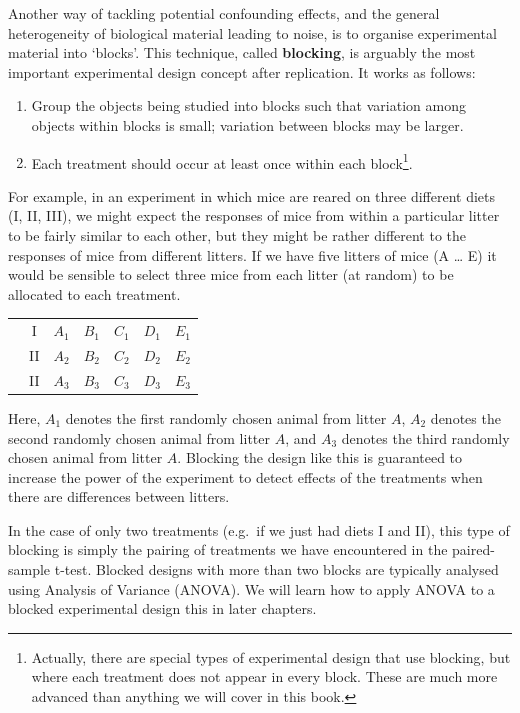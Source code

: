 \documentclass[
]{book}
\begin{document}
Another way of tackling potential confounding effects, and the general heterogeneity of biological material leading to noise, is to organise experimental material into `blocks'. This technique, called \textbf{blocking}, is arguably the most important experimental design concept after replication. It works as follows:

\begin{enumerate}
\def\labelenumi{\arabic{enumi}.}
\item
  Group the objects being studied into blocks such that variation among objects within blocks is small; variation between blocks may be larger.
\item
  Each treatment should occur at least once within each block\footnote{Actually, there are special types of experimental design that use blocking, but where each treatment does not appear in every block. These are much more advanced than anything we will cover in this book.}.
\end{enumerate}

For example, in an experiment in which mice are reared on three different diets (I, II, III), we might expect the responses of mice from within a particular litter to be fairly similar to each other, but they might be rather different to the responses of mice from different litters. If we have five litters of mice (A \ldots{} E) it would be sensible to select three mice from each litter (at random) to be allocated to each treatment.

\begin{longtable}[]{@{}lcccccc@{}}
\toprule
& & & & & & \\
\midrule
\endhead
& I & \(A_{1}\) & \(B_{1}\) & \(C_{1}\) & \(D_{1}\) & \(E_{1}\) \\
& II & \(A_{2}\) & \(B_{2}\) & \(C_{2}\) & \(D_{2}\) & \(E_{2}\) \\
& II & \(A_{3}\) & \(B_{3}\) & \(C_{3}\) & \(D_{3}\) & \(E_{3}\) \\
\bottomrule
\end{longtable}

Here, \(A_{1}\) denotes the first randomly chosen animal from litter \(A\), \(A_{2}\) denotes the second randomly chosen animal from litter \(A\), and \(A_{3}\) denotes the third randomly chosen animal from litter \(A\). Blocking the design like this is guaranteed to increase the power of the experiment to detect effects of the treatments when there are differences between litters.

In the case of only two treatments (e.g.~if we just had diets I and II), this type of blocking is simply the pairing of treatments we have encountered in the paired-sample t-test. Blocked designs with more than two blocks are typically analysed using Analysis of Variance (ANOVA). We will learn how to apply ANOVA to a blocked experimental design this in later chapters.
\end{document}
